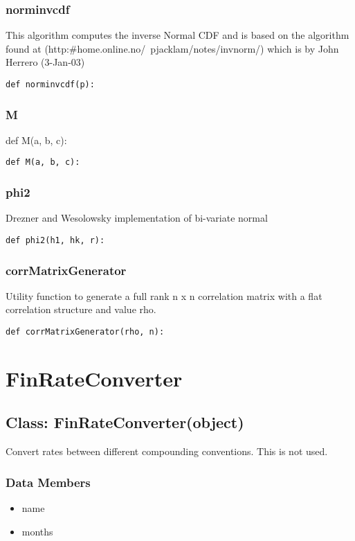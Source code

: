 \documentclass[twoside,11pt]{book}
\begin{document}
\subsubsection*{{\bf norminvcdf}}
This algorithm computes the inverse Normal CDF and is based on the algorithm found at (http:\#home.online.no/~pjacklam/notes/invnorm/) which is by John Herrero (3-Jan-03)  

\begin{lstlisting}
def norminvcdf(p):
\end{lstlisting}

\subsubsection*{{\bf M}}
def M(a, b, c): 

\begin{lstlisting}
def M(a, b, c):
\end{lstlisting}

\subsubsection*{{\bf phi2}}
Drezner and Wesolowsky implementation of bi-variate normal  

\begin{lstlisting}
def phi2(h1, hk, r):
\end{lstlisting}

\subsubsection*{{\bf corrMatrixGenerator}}
Utility function to generate a full rank n x n correlation matrix with a flat correlation structure and value rho.  

\begin{lstlisting}
def corrMatrixGenerator(rho, n):
\end{lstlisting}

\newpage
\section{FinRateConverter}

\subsection*{Class: FinRateConverter(object)}
Convert rates between different compounding conventions. This is not used.  

\subsubsection*{Data Members}
\begin{itemize}
\item{name}
\item{months}
\end{itemize}
\end{document}
